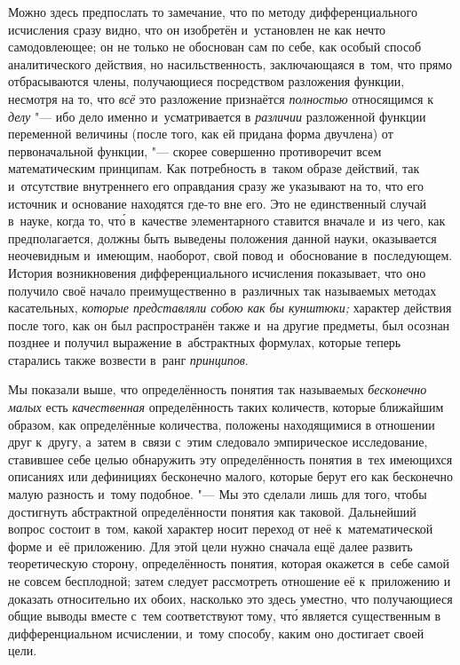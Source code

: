 Можно здесь предпослать то замечание, что по методу дифференциального
исчисления сразу видно, что он изобретён и~установлен не как нечто
самодовлеющее; он не только не обоснован сам по себе, как особый способ
аналитического действия, но насильственность, заключающаяся в~том, что прямо
отбрасываются члены, получающиеся посредством разложения функции, несмотря на
то, что {\em всё} это разложение признаётся {\em полностью} относящимся к
{\em делу} "--- ибо дело именно и~усматривается в {\em различии} разложенной
функции переменной величины (после того, как ей придана форма двучлена) от
первоначальной функции, "--- скорее совершенно противоречит всем математическим
принципам. Как потребность в~таком образе действий, так и~отсутствие
внутреннего его оправдания сразу же указывают на то, что его источник и
основание находятся где-то вне его. Это не единственный случай в~науке, когда
то, чт\'{о} в~качестве элементарного ставится вначале и~из чего, как
предполагается, должны быть выведены положения данной науки, оказывается
неочевидным и~имеющим, наоборот, свой повод и~обоснование в~последующем.
История возникновения дифференциального исчисления показывает, что оно получило
своё начало преимущественно в~различных так называемых методах касательных,
{\em которые представляли собою как бы кунштюки;} характер действия после того,
как он был распространён также и~на другие предметы, был осознан позднее и
получил выражение в~абстрактных формулах, которые теперь старались также
возвести в~ранг {\em принципов}.

Мы показали выше, что определённость понятия так называемых
{\em бесконечно малых} есть {\em качественная} определённость таких количеств,
которые ближайшим образом, как определённые количества, положены находящимися в
отношении друг к~другу, а~затем в~связи с~этим следовало эмпирическое
исследование, ставившее себе целью обнаружить эту определённость понятия в~тех
имеющихся описаниях или дефинициях бесконечно малого, которые берут его как
бесконечно малую разность и~тому подобное. "--- Мы это сделали лишь для того,
чтобы достигнуть абстрактной определённости понятия как таковой. Дальнейший
вопрос состоит в~том, какой характер носит переход от неё к~математической
форме и~её приложению. Для этой цели нужно сначала ещё далее развить
теоретическую сторону, определённость понятия, которая окажется в~себе самой не
совсем бесплодной; затем следует рассмотреть отношение её к~приложению и
доказать относительно их обоих, насколько это здесь уместно, что получающиеся
общие выводы вместе с~тем соответствуют тому, чт\'{о} является существенным в
дифференциальном исчислении, и~тому способу, каким оно достигает своей цели.

